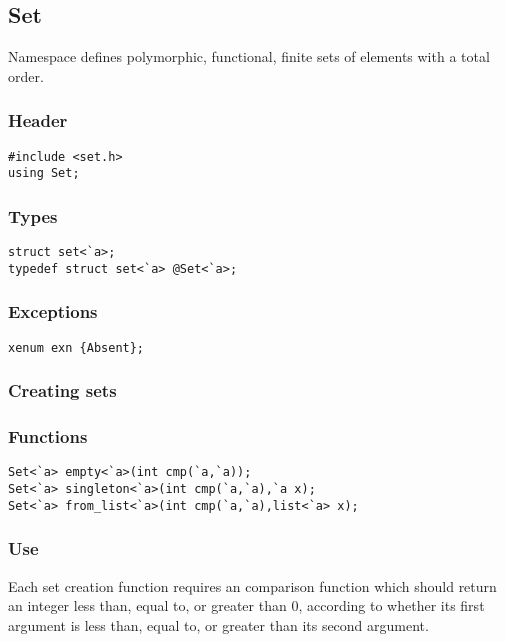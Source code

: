 \subsection{Set}

Namespace  defines polymorphic, functional, finite sets of
elements with a total order.

\subsubsection*{Header}
\begin{verbatim}
#include <set.h>
using Set;
\end{verbatim}

\subsubsection*{Types}
\begin{verbatim}
struct set<`a>;
typedef struct set<`a> @Set<`a>;
\end{verbatim}

\subsubsection*{Exceptions}
\begin{verbatim}
xenum exn {Absent};
\end{verbatim}

\subsubsection*{Creating sets}

\subsubsection*{Functions}
\begin{verbatim}
Set<`a> empty<`a>(int cmp(`a,`a));
Set<`a> singleton<`a>(int cmp(`a,`a),`a x);
Set<`a> from_list<`a>(int cmp(`a,`a),list<`a> x);
\end{verbatim}

\subsubsection*{Use}

Each set creation function requires an comparison function 
which should return an integer less than, equal to, or greater than 0,
according to whether its first argument is less than, equal to, or
greater than its second argument.

